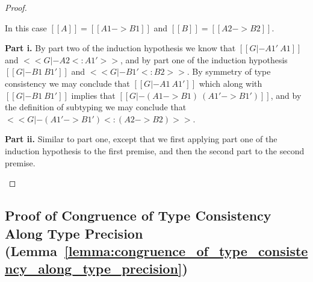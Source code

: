 \begin{proof}
\begin{itemize}
  In this case $[[A]] = [[A1 -> B1]]$ and $[[B]] = [[A2 -> B2]]$.

  \noindent
  \textbf{Part i.} By part two of the induction hypothesis we know
  that $[[G |- A1' ~ A1]]$ and $<<G |- A2 <: A1'>>$, and by part one of the induction hypothesis
  $[[G |- B1 ~ B1']]$ and $<<G |- B1' <: B2>>$.  By symmetry of type consistency
  we may conclude that $[[G |- A1 ~ A1']]$ which along with $[[G |- B1 ~ B1']]$
  implies that $[[G |- (A1 -> B1) ~ (A1' -> B1')]]$, and by the definition of subtyping
  we may conclude that $<<G |- (A1' -> B1') <: (A2 -> B2)>>$.

  \noindent
  \textbf{Part ii.} Similar to part one, except that we first
  applying part one of the induction hypothesis to the first
  premise, and then the second part to the second premise.
  
\end{itemize}
\end{proof}

\subsection{Proof of Congruence of Type Consistency Along Type Precision (Lemma~\ref{lemma:congruence_of_type_consistency_along_type_precision})}
\label{subsec:proof_of_congruence_of_type_consistency_along_type_precision_lemma:congruence_of_type_consistency_along_type_precision}

